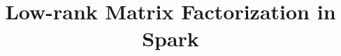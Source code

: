 \documentclass{acm_proc_article-sp}
\begin{document}
\title{Low-rank Matrix Factorization in Spark}


%
%   
%   
%   
%   
%
\end{document}
